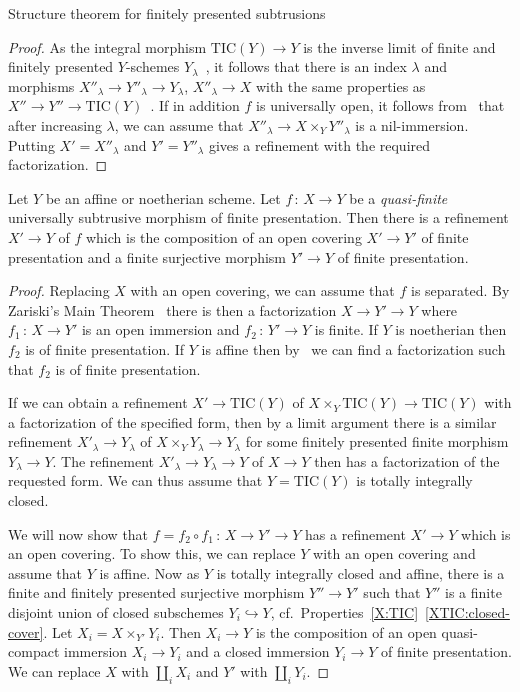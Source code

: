 \documentclass[a4paper,twoside,11pt]{amsart}[2009/07/02] %
\newcommand{\pref}[1]{\eqref{#1}}
\newcommand{\inj}{\hookrightarrow}
\newcommand{\map}[3]{#1\,:\, #2\rightarrow #3}
\newcommand{\TIC}{\mathrm{TIC}}
\begin{document}
\begin{section}{Structure theorem for finitely presented subtrusions}
\begin{proof}
As the integral morphism $\TIC(Y)\to Y$ is the inverse limit of finite and
finitely presented $Y$-schemes $Y_\lambda$~\cite[Lem.~11.5.5.1]{egaIV}, it
follows that there is an index $\lambda$ and morphisms $X''_\lambda\to
Y''_\lambda\to Y_\lambda$, $X''_\lambda\to X$ with the same properties as
$X''\to Y''\to \TIC(Y)$~\cite[Thm.~8.10.5 (xii) and Thm.~11.2.6]{egaIV}. If in
addition $f$ is universally open, it follows from~\cite[Thm.~8.10.5 (ii) and
(vi)]{egaIV} that after increasing $\lambda$, we can assume that
$X''_\lambda\to X\times_Y Y''_\lambda$ is a nil-immersion. Putting
$X'=X''_\lambda$ and $Y'=Y''_\lambda$ gives a refinement with the required
factorization.
\end{proof}

\begin{theorem}\label{T:STf-noeth/aff}
Let $Y$ be an affine or noetherian scheme. Let $\map{f}{X}{Y}$ be a
\emph{quasi-finite} universally subtrusive morphism of finite
presentation. Then there is a refinement $X'\to Y$ of $f$ which is the
composition of an open covering $X'\to Y'$ of finite presentation and a finite
surjective morphism $Y'\to Y$ of finite presentation.
\end{theorem}
\begin{proof}
Replacing $X$ with an open covering, we can assume that $f$ is separated. By
Zariski's Main Theorem~\cite[Thm.~8.12.6]{egaIV} there is then a factorization
$X\to Y'\to Y$ where $\map{f_1}{X}{Y'}$ is an open immersion and
$\map{f_2}{Y'}{Y}$ is finite. If $Y$ is noetherian then $f_2$ is of finite
presentation. If $Y$ is affine then by~\cite[Rem.~8.12.7]{egaIV} we can find a
factorization such that $f_2$ is of finite presentation.

If we can obtain a refinement $X'\to \TIC(Y)$ of $X\times_Y \TIC(Y)\to \TIC(Y)$
with a factorization of the specified form, then by a limit argument there is a
similar refinement $X'_\lambda\to Y_\lambda$ of $X\times_Y Y_\lambda\to
Y_\lambda$ for some finitely presented finite morphism $Y_\lambda\to Y$. The
refinement $X'_\lambda\to Y_\lambda\to Y$ of $X\to Y$ then has a factorization
of the requested form. We can thus assume that $Y=\TIC(Y)$ is totally
integrally closed.

We will now show that $\map{f=f_2\circ f_1}{X}{Y'\to Y}$ has a refinement
$X'\to Y$ which is an open covering. To show this, we can replace $Y$ with an
open covering and assume that $Y$ is affine. Now as $Y$ is totally integrally
closed and affine, there is a finite and finitely presented surjective morphism
$Y''\to Y'$ such that $Y''$ is a finite disjoint union of closed subschemes
$Y_i\inj Y$, cf.\ Properties~\pref{X:TIC}\ \ref{XTIC:closed-cover}. Let
$X_i=X\times_{Y'} Y_i$. Then $X_i\to Y$ is the composition of an open
quasi-compact immersion $X_i\to Y_i$ and a closed immersion $Y_i\to Y$ of
finite presentation. We can replace $X$ with $\coprod_i X_i$ and $Y'$ with
$\coprod_i Y_i$.


\end{proof}
\end{section}
\end{document}
